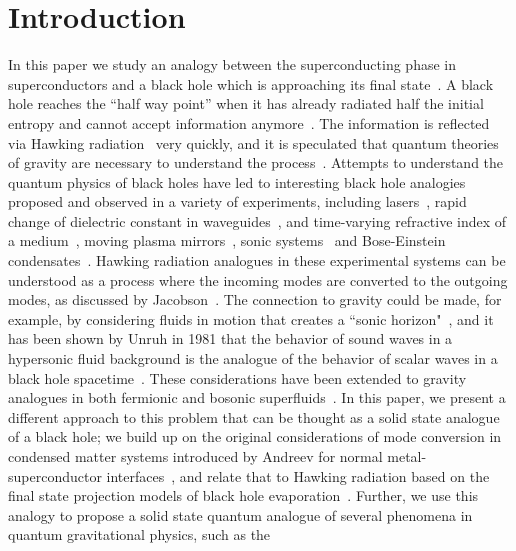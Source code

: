 \documentclass[12pt,letterpaper,aps,onecolumn,superscriptaddress,floatfix,notitlepage]{revtex4-1}
\begin{document}
	\maketitle
	\section{Introduction}
	\label{S:1}
	In this paper we study an analogy between the superconducting phase in superconductors and a black hole which is approaching its final state~\cite{horowitz,preskill}. A black hole reaches the ``half way point'' when it has already radiated half the initial entropy and cannot accept information anymore~\cite{preskill}. The information is reflected via Hawking radiation~\cite{Hawking1975} very quickly, and it is speculated that quantum theories of gravity are necessary to understand the process~\cite{preskill,horowitz,projection,infopara}. Attempts to understand the quantum physics of black holes have led to interesting black hole analogies proposed and observed in a variety of experiments, including lasers~\cite{bec,laser}, rapid change of dielectric constant in waveguides~\cite{waveguide}, and time-varying refractive index of a medium~\cite{Refraction}, moving plasma mirrors~\cite{plasma}, sonic systems~\cite{sound1,sound2} and  Bose-Einstein condensates~\cite{zapata2011resonant}. Hawking radiation analogues in these experimental systems can be understood as a process where the incoming modes are converted to the outgoing modes, as discussed by Jacobson~\cite{bhmodes}. The connection to gravity could be made, for example, by considering fluids in motion that creates a ``sonic horizon"~\cite{zapata2011resonant}, and it has been shown by Unruh in 1981 that the behavior of sound waves in a hypersonic fluid background is the analogue of the behavior of scalar waves in a black hole spacetime~\cite{sound1,sound2}. These considerations have been extended to gravity analogues in both fermionic and bosonic superfluids~\cite{fischer2001thermal}. In this paper, we present a different approach to this problem that can be thought as a solid state analogue of a black hole; we build up on the original considerations of mode conversion in condensed matter systems introduced by Andreev for normal metal-superconductor interfaces~\cite{andreev,Pannet,spintron,artemenko1978excess,artemenko1979theory,artemenko1979excess,zaitsev1980theory}, and relate that to Hawking radiation based on the final state projection models of black hole evaporation~\cite{horowitz,projection}. Further, we use this analogy to propose a solid state quantum analogue of several phenomena in quantum gravitational physics, such as the 
\end{document}
